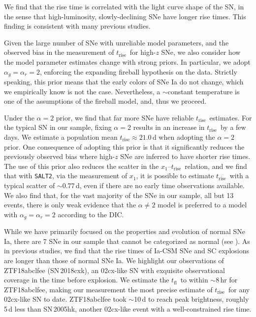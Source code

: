 \documentclass[twocolumn]{./aastex63}
\newcommand{\tfl}{$t_\mathrm{fl}$}
\newcommand{\trise}{$t_\mathrm{rise}$}
\begin{document}
We find that the rise time is correlated with the light curve shape of the SN,
in the sense that high-luminosity, slowly-declining SNe have longer rise
times. This finding is consistent with many previous studies.

Given the large number of SNe with unreliable model parameters, and the
observed bias in the measurement of \trise\ for high-$z$ SNe, we also consider
how the model parameter estimates change with strong priors. In particular, we
adopt $\alpha_g = \alpha_r = 2$, enforcing the expanding fireball hypothesis
on the data. Strictly speaking, this prior means that the early colors of SNe
Ia do not change, which we empirically know is not the case. Nevertheless, a
$\sim$constant temperature is one of the assumptions of the fireball model,
and, thus we proceed.

Under the $\alpha = 2$ prior, we find that far more SNe have reliable \trise\
estimates. For the typical SN in our sample, fixing $\alpha = 2$ results in an
increase in \trise\ by a few days. We estimate a population mean \trise\;$
\approx 21.0$\,d when adopting the $\alpha = 2$ prior. One consequence of
adopting this prior is that it significantly reduces the previously observed
bias where high-$z$ SNe are inferred to have shorter rise times. The use of
this prior also reduces the scatter in the $x_1$--\trise\ relation, and we
find that with \texttt{SALT2}, via the measurement of $x_1$, it is possible to
estimate \trise\ with a typical scatter of $\sim$0.77\,d, even if there are no
early time observations available. We also find that, for the vast majority of
the SNe in our sample, all but 13 events, there is only weak evidence that the
$\alpha \ne 2$ model is preferred to a model with $\alpha_g = \alpha_r = 2$
according to the DIC.

While we have primarily focused on the properties and evolution of normal SNe
Ia, there are 7 SNe in our sample that cannot be categorized as normal (see
\citealt{Yao19}). As in previous studies, we find that the rise times of
Ia-CSM SNe and SC explosions are longer than those of normal SNe Ia. We
highlight our observations of ZTF18abclfee (SN\,2018cxk), an 02cx-like SN with
exquisite observational coverage in the time before explosion. We estimate the
\tfl\ to within $\sim$8\,hr for ZTF18abclfee, making our measurement the most
precise estimate of \trise\ for any 02cx-like SN to date. ZTF18abclfee took
$\sim$10\,d to reach peak brightness, roughly 5\,d less than SN\,2005hk,
another 02cx-like event with a well-constrained rise time.
\end{document}
